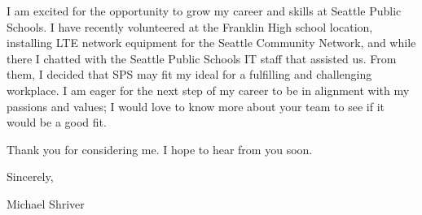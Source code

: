 \documentclass[10pt,oneside]{article}
\begin{document}
\vspace{\baselineskip}

I am excited for the opportunity to grow my career and skills at Seattle Public Schools. I have recently volunteered at the Franklin High school location, installing LTE network equipment for the Seattle Community Network, and while there I chatted with the Seattle Public Schools IT staff that assisted us. From them, I decided that SPS may fit my ideal for a fulfilling and challenging workplace. I am eager for the next step of my career to be in alignment with my passions and values; I would love to know more about your team to see if it would be a good fit.

\vspace{\baselineskip}

Thank you for considering me. I hope to hear from you soon.

\vspace{\baselineskip}

Sincerely,

\vspace{\baselineskip}

Michael Shriver
\end{document}
